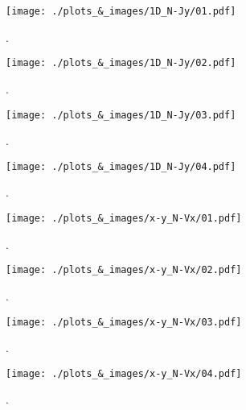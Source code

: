 \documentclass[12pt, letterpaper]{article}
\begin{document}
\begin{figure}[!ht]
\begin{center}
	\texttt{[image: ./plots\_\&\_images/1D\_N-Jy/01.pdf]}
	\caption{.}
	\label{fig:1D_N-Jy_01}
\end{center}
\end{figure}
\begin{figure}[!ht]
\begin{center}
	\texttt{[image: ./plots\_\&\_images/1D\_N-Jy/02.pdf]}
	\caption{.}
	\label{fig:1D_N-Jy_02}
\end{center}
\end{figure}
\begin{figure}[!ht]
\begin{center}
	\texttt{[image: ./plots\_\&\_images/1D\_N-Jy/03.pdf]}
	\caption{.}
	\label{fig:1D_N-Jy_03}
\end{center}
\end{figure}
\begin{figure}[!ht]
\begin{center}
	\texttt{[image: ./plots\_\&\_images/1D\_N-Jy/04.pdf]}
	\caption{.}
	\label{fig:1D_N-Jy_04}
\end{center}
\end{figure}

\begin{figure}[!ht]
\begin{center}
	\texttt{[image: ./plots\_\&\_images/x-y\_N-Vx/01.pdf]}
	\caption{.}
	\label{fig:x-y_N-Vx_01}
\end{center}
\end{figure}
\begin{figure}[!ht]
\begin{center}
	\texttt{[image: ./plots\_\&\_images/x-y\_N-Vx/02.pdf]}
	\caption{.}
	\label{fig:x-y_N-Vx_02}
\end{center}
\end{figure}
\begin{figure}[!ht]
\begin{center}
	\texttt{[image: ./plots\_\&\_images/x-y\_N-Vx/03.pdf]}
	\caption{.}
	\label{fig:x-y_N-Vx_03}
\end{center}
\end{figure}
\begin{figure}[!ht]
\begin{center}
	\texttt{[image: ./plots\_\&\_images/x-y\_N-Vx/04.pdf]}
	\caption{.}
	\label{fig:x-y_N-Vx_04}
\end{center}
\end{figure}
\end{document}
